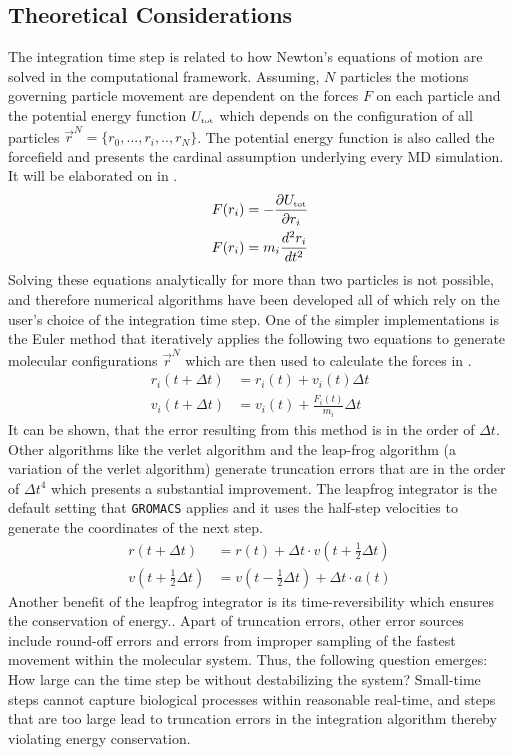 \documentclass[9pt,tutorial]{livecoms}
\begin{document}
\subsection*{Theoretical Considerations}
The integration time step is related to how Newton's equations of motion are solved in the computational framework. Assuming, $N$ particles the motions governing particle movement are dependent on the forces $F$ on each particle and the potential energy function $U_\text{\tiny tot}$ which depends on the configuration of all particles $\Vec{r}^N = \{r_0,...,r_i,..,r_N\}$.\cite{Allen1990} The potential energy function is also called the forcefield and presents the cardinal assumption underlying every MD simulation. It will be elaborated on in .
\begin{align}\label{eq:NewtonsEqOfMotion}
    F(r_i) & = -\frac{\partial U_\text{\tiny tot}}{\partial r_i} \\
    F(r_i) & = m_i\frac{d^2 r_i}{dt^2}
\end{align}
Solving these equations analytically for more than two particles is not possible, and therefore numerical algorithms have been developed all of which rely on the user's choice of the integration time step. One of the simpler implementations is the Euler method that iteratively applies the following two equations to generate molecular configurations $\Vec{r}^N$ which are then used to calculate the forces in .\cite{Atkinson1989}
\begin{align}
    r_i(t + \Delta t) &= r_i(t) + v_i(t)\Delta t \\
    v_i(t + \Delta t) &= v_i(t) + \frac{F_i(t)}{m_i}\Delta t
\end{align}
It can be shown, that the error resulting from this method is in the order of $\Delta t$.\cite{Iserles2008_page8} Other algorithms like the verlet algorithm and the leap-frog algorithm (a variation of the verlet algorithm\cite{Allen1990}) generate truncation errors that are in the order of $\Delta t^4$ which presents a substantial improvement.\cite{Kim2014} The leapfrog integrator is the default setting that \texttt{GROMACS} applies and it uses the half-step velocities to generate the coordinates of the next step.\cite{Allen1990}
\begin{align}
    r(t + \Delta t) & = r(t) + \Delta t \cdot v(t+\tfrac{1}{2}\Delta t)\\
    v(t + \tfrac{1}{2} \Delta t) &= v(t - \tfrac{1}{2} \Delta t) + \Delta t \cdot a(t)
\end{align}
Another benefit of the leapfrog integrator is its time-reversibility which ensures the conservation of energy.\cite{Kim_2014}. Apart of truncation errors, other error sources include round-off errors and errors from improper sampling of the fastest movement within the molecular system. Thus, the following question emerges: How large can the time step be without destabilizing the system? Small-time steps cannot capture biological processes within reasonable real-time, and steps that are too large lead to truncation errors in the integration algorithm thereby violating energy conservation.
\end{document}

